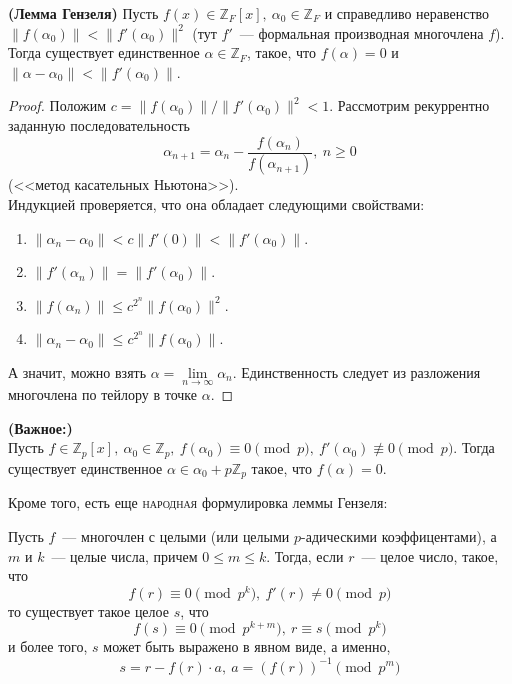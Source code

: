 \documentclass[11pt]{report}
\begin{document}
    \begin{theorem} \textbf{(Лемма Гензеля)}
        Пусть $f(x) \in \mathbb{Z}_{F}[x], \ \alpha_0 \in \mathbb{Z}_{F}$ и справедливо неравенство $\| f(\alpha_0) \| < \| f'(\alpha_0)\|^2$ (тут $f'$~--- формальная производная многочлена $f$).
        Тогда существует единственное $\alpha \in \mathbb{Z}_{F}$, такое, что $f(\alpha) = 0$ и $\| \alpha - \alpha_0\| < \| f'(\alpha_0) \|$.
    \end{theorem}
    \begin{proof}
        Положим $c = \| f(\alpha_0) \| / \| f'(\alpha_0)\|^2 < 1$. Рассмотрим рекуррентно заданную последовательность
        \[ \alpha_{n + 1} = \alpha_n - \frac{f(\alpha_n)}{f(\alpha_{n + 1})}, \ n \ge 0 \]
        (<<метод касательных Ньютона>>). \\
        Индукцией проверяется, что она обладает следующими свойствами:
        \begin{enumerate}
            \item $\| \alpha_n - \alpha_0 \| < c \| f'(0) \| < \| f'(\alpha_0) \|$.
            \item $\| f'(\alpha_n)\| = \| f'(\alpha_0)\|$.
            \item $\| f(\alpha_n) \| \le c^{2^n} \| f(\alpha_0) \|^2$.
            \item $\| \alpha_n - \alpha_0 \| \le c^{2^n} \| f(\alpha_0) \|$.
        \end{enumerate}

        А значит, можно взять $\alpha = \lim\limits_{n \to \infty} \alpha_n$.
        Единственность следует из разложения многочлена по тейлору в точке $\alpha$.
    \end{proof}
    \begin{corollary} \textbf{(Важное:)} \\
         Пусть $f \in \mathbb{Z}_p[x], \ \alpha_0 \in \mathbb{Z}_p,\ f(\alpha_0) \equiv 0 \pmod{p}, \ f'(\alpha_0) \not\equiv 0 \pmod{p}$.
        Тогда существует единственное $\alpha \in \alpha_0 + p\mathbb{Z}_p$ такое, что $f(\alpha) = 0$.
     \end{corollary}

    Кроме того, есть еще \textsc{народная} формулировка леммы Гензеля:
    \begin{theorem}
        Пусть $f$~--- многочлен с целыми (или целыми $p$-адическими коэффицентами), а $m$ и  $k$~--- целые числа, причем
        $0 \le m \le k$. Тогда, если $r$~--- целое число, такое, что
        \[ f(r) \equiv 0 \pmod{p^k}, \ f'(r) \neq 0 \pmod{p} \]
        то существует такое целое $s$, что
        \[ f(s) \equiv 0 \pmod{p^{k + m}}, \  r \equiv s \pmod{p^k} \]
        и более того, $s$ может быть выражено в явном виде, а именно,
        \[ s = r - f(r) \cdot a, \ a = (f(r))^{-1} \pmod{p^m}\]

    \end{theorem}
\end{document}
